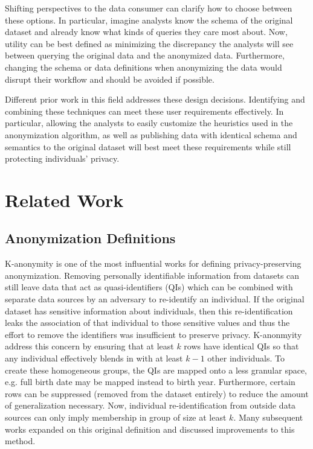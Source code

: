 Shifting perspectives to the data consumer can clarify how to choose between these options. In particular, imagine analysts know the schema of the original dataset and already know what kinds of queries they care most about. Now, utility can be best defined as minimizing the discrepancy the analysts will see between querying the original data and the anonymized data. Furthermore, changing the schema or data definitions when anonymizing the data would disrupt their workflow and should be avoided if possible.

Different prior work in this field addresses these design decisions. Identifying and combining these techniques can meet these user requirements effectively. In particular, allowing the analysts to easily customize the heuristics used in the anonymization algorithm, as well as publishing data with identical schema and semantics to the original dataset will best meet these requirements while still protecting individuals' privacy.

\section{Related Work}
\subsection{Anonymization Definitions}
K-anonymity\cite{sweeneykAnonymity} is one of the most influential works for defining privacy-preserving anonymization. Removing personally identifiable information from datasets can still leave data that act as quasi-identifiers (QIs) which can be combined with separate data sources by an adversary to re-identify an individual. If the original dataset has sensitive information about individuals, then this re-identification leaks the association of that individual to those sensitive values and thus the effort to remove the identifiers was insufficient to preserve privacy. K-anonmyity address this concern by ensuring that at least $k$ rows have identical QIs so that any individual effectively blends in with at least $k-1$ other individuals. To create these homogeneous groups, the QIs are mapped onto a less granular space, e.g. full birth date may be mapped instead to birth year. Furthermore, certain rows can be suppressed (removed from the dataset entirely) to reduce the amount of generalization necessary. Now, individual re-identification from outside data sources can only imply membership in group of size at least $k$. Many subsequent works expanded on this original definition and discussed improvements to this method.


